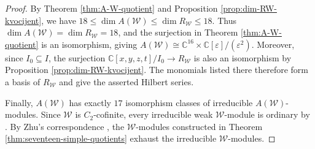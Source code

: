 \documentclass[11pt]{amsart}
\numberwithin{equation}{section}
\theoremstyle{definition}
\theoremstyle{remark}
\begin{document}
\begin{proof}
	By Theorem \ref{thm:A-W-quotient} and Proposition \ref{prop:dim-RW-kvocijent}, we have
	$	18\leq \dim A(\mathcal W) \leq\dim R_{\mathcal W}\leq18$.
	Thus $\dim A(\mathcal W)=\dim R_{\mathcal W}=18$, and the surjection
	in Theorem \ref{thm:A-W-quotient} is an isomorphism, giving
	$	A(\mathcal W)\cong\mathbb C^{16}\times
	\mathbb C[\varepsilon]/(\varepsilon^2).	$
	Moreover, since $I_0 \subseteq I$,
	the surjection $\mathbb C[x,y,z,t]/I_0\to R_{\mathcal W}$ is also an
	isomorphism by Proposition \ref{prop:dim-RW-kvocijent}.
	The monomials listed there therefore form a basis
	of $R_{\mathcal W}$ and give the asserted Hilbert series.
	
	Finally, $A(\mathcal W)$ has exactly $17$ isomorphism classes of irreducible $A(\mathcal W)$-modules.
	Since $\mathcal W$ is $C_2$-cofinite, every irreducible weak
	$\mathcal W$-module is ordinary by \cite[Corollary~5.8]{ABD}.
	By Zhu's correspondence \cite[Theorem~2.2.2]{Zhu}, the $\mathcal W$-modules constructed
	in Theorem \ref{thm:seventeen-simple-quotients} exhaust the irreducible
	$\mathcal W$-modules.
\end{proof}



\end{document}
